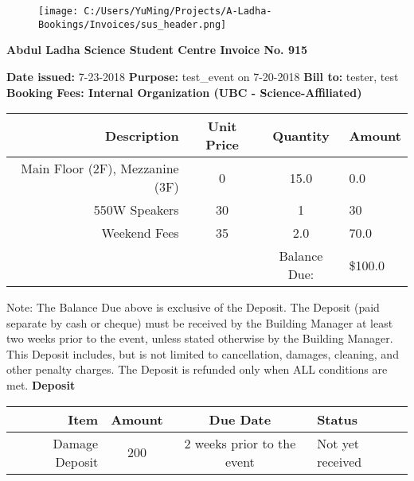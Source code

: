 \documentclass{article}%
\begin{document}
%
\normalsize%
\noindent%


\begin{figure}[h!]%
\centering%
\centering%
\texttt{[image: C:/Users/YuMing/Projects/A-Ladha-Bookings/Invoices/sus\_header.png]}%
\end{figure}

%
\begin{center}%
\textbf{Abdul Ladha Science Student Centre Invoice No. 915}%
\end{center}%
\textbf{ }%
\newline%
\textbf{Date issued: }%
7{-}23{-}2018%
\newline%
\textbf{Purpose: }%
test\_event on 7{-}20{-}2018%
\newline%
\textbf{Bill to: }%
tester, test%
\newline%
\newline%
\textbf{Booking Fees: Internal Organization (UBC {-} Science{-}Affiliated)}%
\newline%
\begin{tabular}{|r|ccl|}%
\hline%
Description&Unit Price&Quantity&Amount\\%
\hline%
Main Floor (2F), Mezzanine (3F)&0&15.0&0.0\\%
\hline%
550W Speakers&30&1&30\\%
\hline%
Weekend Fees&35&2.0&70.0\\%
\hline%
&&Balance Due:&\$100.0\\%
\hline%
\end{tabular}%
\newline%
\newline%
Note: The Balance Due above is exclusive of the Deposit.         The Deposit (paid separate by cash or cheque) must be received by the Building Manager         at least two weeks prior to the event, unless stated otherwise by the Building Manager.         This Deposit includes, but is not limited to cancellation, damages, cleaning, and other penalty charges.         The Deposit is refunded only when ALL conditions are met.%
\newline%
\newline%
\textbf{Deposit}%
\newline%
\begin{tabular}{|r|c|c|l|}%
\hline%
Item&Amount&Due Date&Status\\%
\hline%
Damage Deposit&200&2 weeks prior to the event&Not yet received\\%
\hline%
\end{tabular}%
\newline%
\end{document}
